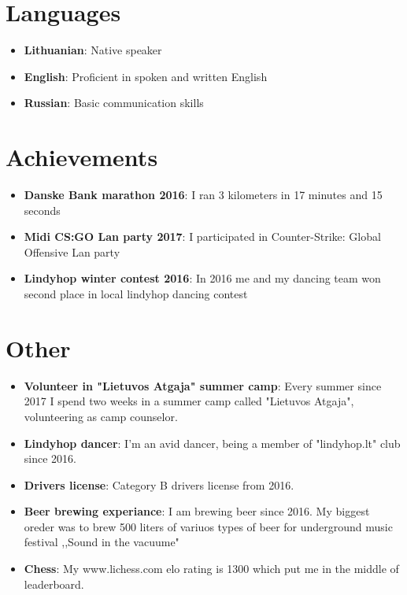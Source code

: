 \documentclass[letterpaper,11pt]{article}
\newcommand{\resumeItem}[2]{
  \item\small{
    \textbf{#1}{: #2 \vspace{-2pt}}
  }
}
\newcommand{\resumeSubItem}[2]{\resumeItem{#1}{#2}\vspace{-4pt}}
\newcommand{\resumeSubHeadingListStart}{\begin{itemize}[leftmargin=*]}
\newcommand{\resumeSubHeadingListEnd}{\end{itemize}}
\begin{document}
\section{Languages}
  \resumeSubHeadingListStart
    \item{
      \textbf{Lithuanian}{: Native speaker}
      \hfill
    }
    \item{
	\textbf{English}{: Proficient in spoken and written English}
	\hfil
	}

    \item{
	\textbf{Russian}{: Basic communication skills}
	\hfil
	}
  \resumeSubHeadingListEnd

\section{Achievements}
  \resumeSubHeadingListStart
    \item{
      \textbf{Danske Bank marathon 2016}{: I ran 3 kilometers in 17 minutes and 15 seconds}
      \hfill
    }
    \item{
	\textbf{Midi CS:GO Lan party 2017}{: I participated in Counter-Strike: Global Offensive Lan party}
	\hfil
	}
    \item{
	\textbf{Lindyhop winter contest 2016}{: In 2016 me and my dancing team won second place in local lindyhop dancing contest}
	\hfil
	}


  \resumeSubHeadingListEnd

\section{Other}
  \resumeSubHeadingListStart
    \resumeSubItem{Volunteer in "Lietuvos Atgaja" summer camp}
      {Every summer since 2017 I spend two weeks in a  summer camp called "Lietuvos Atgaja", volunteering as camp counselor.}
        \resumeSubItem{Lindyhop dancer}
      {I'm an avid dancer, being a member of "lindyhop.lt" club since 2016.}
    \resumeSubItem{Drivers license}
      {Category B drivers license from 2016.}
    \resumeSubItem{Beer brewing experiance}
      {I am brewing beer since 2016. My biggest oreder was to brew 500 liters of variuos types of beer for underground music festival ,,Sound in the vacuume"}
    \resumeSubItem{Chess}
      {My www.lichess.com elo rating is 1300 which put me in the middle of leaderboard.
}   
  \resumeSubHeadingListEnd
\end{document}
